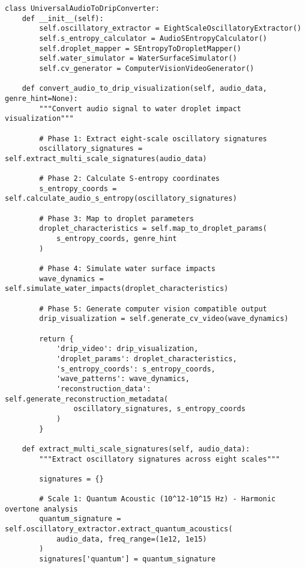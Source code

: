\documentclass[12pt,a4paper]{article}
\begin{document}
\begin{lstlisting}[style=pythonstyle, caption=Core Audio-to-Drip Implementation]
class UniversalAudioToDripConverter:
    def __init__(self):
        self.oscillatory_extractor = EightScaleOscillatoryExtractor()
        self.s_entropy_calculator = AudioSEntropyCalculator()
        self.droplet_mapper = SEntropyToDropletMapper()
        self.water_simulator = WaterSurfaceSimulator()
        self.cv_generator = ComputerVisionVideoGenerator()
        
    def convert_audio_to_drip_visualization(self, audio_data, genre_hint=None):
        """Convert audio signal to water droplet impact visualization"""
        
        # Phase 1: Extract eight-scale oscillatory signatures
        oscillatory_signatures = self.extract_multi_scale_signatures(audio_data)
        
        # Phase 2: Calculate S-entropy coordinates
        s_entropy_coords = self.calculate_audio_s_entropy(oscillatory_signatures)
        
        # Phase 3: Map to droplet parameters
        droplet_characteristics = self.map_to_droplet_params(
            s_entropy_coords, genre_hint
        )
        
        # Phase 4: Simulate water surface impacts
        wave_dynamics = self.simulate_water_impacts(droplet_characteristics)
        
        # Phase 5: Generate computer vision compatible output
        drip_visualization = self.generate_cv_video(wave_dynamics)
        
        return {
            'drip_video': drip_visualization,
            'droplet_params': droplet_characteristics,
            's_entropy_coords': s_entropy_coords,
            'wave_patterns': wave_dynamics,
            'reconstruction_data': self.generate_reconstruction_metadata(
                oscillatory_signatures, s_entropy_coords
            )
        }
    
    def extract_multi_scale_signatures(self, audio_data):
        """Extract oscillatory signatures across eight scales"""
        
        signatures = {}
        
        # Scale 1: Quantum Acoustic (10^12-10^15 Hz) - Harmonic overtone analysis
        quantum_signature = self.oscillatory_extractor.extract_quantum_acoustics(
            audio_data, freq_range=(1e12, 1e15)
        )
        signatures['quantum'] = quantum_signature
        

\end{lstlisting}
\end{document}
